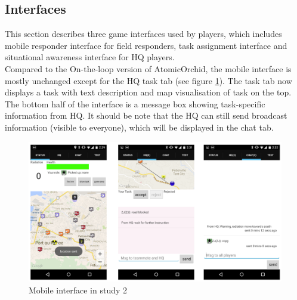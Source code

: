 

\subsection{Interfaces}
This section describes three game interfaces used by players, which includes mobile responder interface for field responders, task assignment interface and situational awareness interface for HQ players.\\

Compared to the On-the-loop version of AtomicOrchid, the mobile interface is mostly unchanged except for the HQ task tab (see figure \ref{fig:study3mobileInterface}). The task tab now displays a task with text description and map visualisation of task on the top. The bottom half of the interface is a message box showing task-specific information from HQ. It should be note that the HQ can still send broadcast information (visible to everyone), which will be displayed in the chat tab. \\

\begin{figure}[h]
  \centering
  \includegraphics[width=1\textwidth]{img/study3/system/mobileInterface}
  \caption{Mobile interface in study 2}
  \label{fig:study3mobileInterface}
\end{figure}


